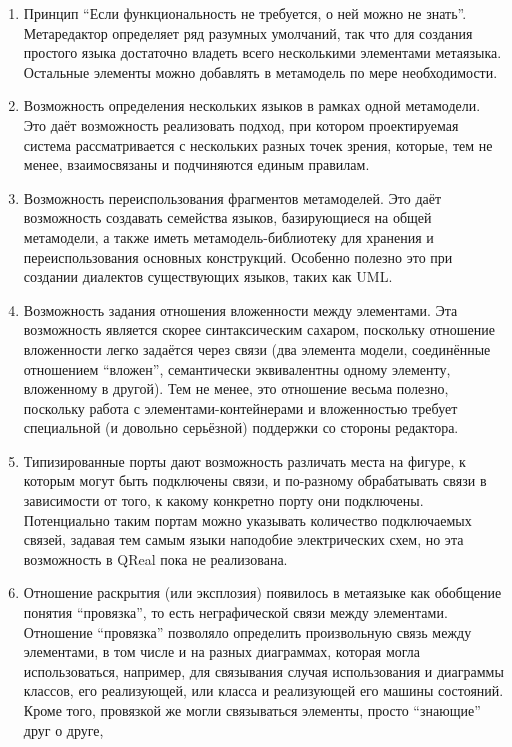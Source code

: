 \begin{enumerate}
	\item Принцип "`Если функциональность не требуется, о ней можно не знать"'. Метаредактор 
		определяет ряд разумных умолчаний, так что для создания простого языка достаточно 
		владеть всего несколькими элементами метаязыка. Остальные элементы можно добавлять 
		в метамодель по мере необходимости.
	\item Возможность определения нескольких языков в рамках одной метамодели. Это даёт 
		возможность реализовать подход, при котором проектируемая система рассматривается 
		с нескольких разных точек зрения, которые, тем не менее, взаимосвязаны и подчиняются 
		единым правилам.
	\item Возможность переиспользования фрагментов метамоделей. Это даёт возможность 
		создавать семейства языков, базирующиеся на общей метамодели, а также иметь метамодель-библиотеку 
		для хранения и переиспользования основных конструкций. Особенно полезно это при 
		создании диалектов существующих языков, таких как UML.
	\item Возможность задания отношения вложенности между элементами. Эта возможность 
		является скорее синтаксическим сахаром, поскольку отношение вложенности легко 
		задаётся через связи (два элемента модели, соединённые отношением "`вложен"', 
		семантически эквивалентны одному элементу, вложенному в другой). Тем не менее, 
		это отношение весьма полезно, поскольку работа с элементами-контейнерами и вложенностью 
		требует специальной (и довольно серьёзной) поддержки со стороны редактора.
	\item Типизированные порты дают возможность различать места на фигуре, к которым 
		могут быть подключены связи, и по-разному обрабатывать связи в зависимости от 
		того, к какому конкретно порту они подключены. Потенциально таким портам можно 
		указывать количество подключаемых связей, задавая тем самым языки наподобие электрических 
		схем, но эта возможность в QReal пока не реализована.
	\item Отношение раскрытия (или эксплозия) появилось в метаязыке как обобщение понятия 
		"`провязка"', то есть неграфической связи между элементами. Отношение "`провязка"' 
		позволяло определить произвольную связь между элементами, в том числе и на разных 
		диаграммах, которая могла использоваться, например, для связывания случая использования 
		и диаграммы классов, его реализующей, или класса и реализующей его машины состояний. 
		Кроме того, провязкой же могли связываться элементы, просто "`знающие"' друг о друге, 

\end{enumerate}

